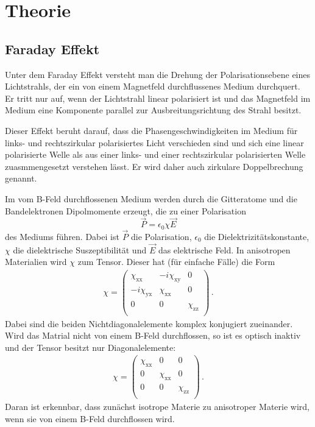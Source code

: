 \section{Theorie}
\label{sec:Theorie}

\subsection{Faraday Effekt}
\label{subsec:faraday}
Unter dem Faraday Effekt versteht man die Drehung der Polarisationsebene eines
Lichtstrahls, der ein von einem Magnetfeld durchflussenes Medium durchquert.
Er tritt nur auf, wenn der Lichtstrahl linear polarisiert ist und das Magnetfeld
im Medium eine Komponente parallel zur Ausbreitungsrichtung des Strahl besitzt.

Dieser Effekt beruht darauf, dass die Phasengeschwindigkeiten im Medium für links- und
rechtszirkular polarisiertes Licht verschieden sind und sich eine linear polarisierte
Welle als aus einer links- und einer rechtszirkular polarisierten Welle zuasmmengesetzt
verstehen lässt. Er wird daher auch zirkulare Doppelbrechung genannt.

Im vom B-Feld durchflossenen Medium werden durch die Gitteratome und die Bandelektronen
Dipolmomente erzeugt, die zu einer Polarisation
\begin{equation}
  \vec{P} = \epsilon_0 \chi \vec{E}
  \label{eqn:polarisation}
\end{equation}
des Mediums führen. Dabei ist $\vec{P}$ die Polarisation, $\epsilon_0$ die
Dielektrizitätskonstante, $\chi$ die dielektrische Suszeptibilität und
$\vec{E}$ das elektrische Feld. In anisotropen Materialien wird $\chi$ zum Tensor.
Dieser hat (für einfache Fälle) die Form
\begin{align}
  \chi =
  \left( \begin{matrix}
         \chi_{\mathrm{xx}} & -i \chi_{\mathrm{xy}} & 0 \\
         -i \chi_{\mathrm{yx}} & \chi_{\mathrm{xx}} & 0 \\
         0 & 0 & \chi_{\mathrm{zz}}  \\
  \end{matrix} \right)\,.
  \label{eqn:chitensor}
\end{align}
Dabei sind die beiden Nichtdiagonalelemente komplex konjugiert zueinander. Wird das
Matrial nicht von einem B-Feld durchflossen, so ist es optisch inaktiv und der
Tensor besitzt nur Diagonalelemente:
\begin{align}
  \chi =
  \left( \begin{matrix}
         \chi_{\mathrm{xx}} & 0 & 0 \\
         0 & \chi_{\mathrm{xx}} & 0 \\
         0 & 0 & \chi_{\mathrm{zz}}  \\
  \end{matrix} \right) \,.
  \label{eqn:chitensor2}
\end{align}
Daran ist erkennbar, dass zunächst isotrope Materie zu anisotroper Materie wird,
wenn sie von einem B-Feld durchflossen wird.

